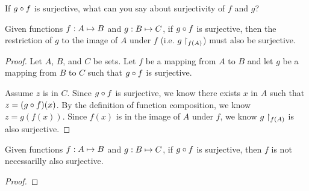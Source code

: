 \documentclass[main.tex]{subfiles}
\begin{document}
\subproblem{}\label{s2p4e}

If \({g} \circ{} {f}\) is surjective, what can you say about surjectivity of
\(f\) and \(g\)?

\begin{thm}
	Given functions \({f}: {A} \mapsto{} {B}\) and \({g}: {B} \mapsto{} {C}\), if
	\({g} \circ{} {f}\) is surjective, then the restriction of \(g\) to the
	image of \(A\) under \(f\) (i.e. \({g}\restriction_{f(A)}\)) must also be
	surjective.
\end{thm}
\begin{proof}
	Let \(A\), \(B\), and \(C\) be sets. Let \(f\) be a mapping from \(A\)
	to \(B\) and let \(g\) be a mapping from \(B\) to \(C\) such that
	\({g} \circ{} {f}\) is surjective.

	Assume \(z\) is in \(C\). Since \({g} \circ{} {f}\) is surjective, we
	know there exists \(x\) in \(A\) such that \(z = ({g} \circ{} {f})(x)\).
	By the definition of function composition, we know \(z = g(f(x))\).
	Since \(f(x)\) is in the image of \(A\) under \(f\), we know
	\({g}\restriction_{f(A)}\) is also surjective.
\end{proof}

\begin{thm}
	Given functions \({f}: {A} \mapsto{} {B}\) and \({g}: {B} \mapsto{} {C}\), if
	\({g} \circ{} {f}\) is surjective, then \(f\) is not necessarilly also
	surjective.
\end{thm}
\begin{proof}
	\todo{}
\end{proof}
\end{document}
